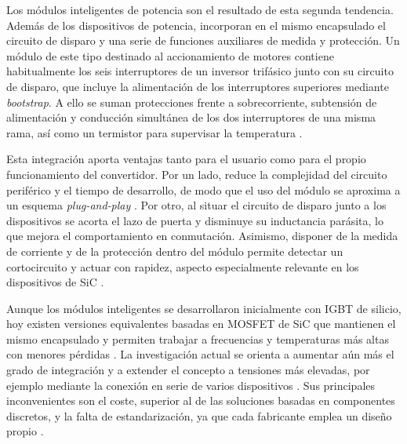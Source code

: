 Los módulos inteligentes de potencia son el resultado de esta segunda tendencia. Además de los dispositivos de potencia, incorporan en el mismo encapsulado el circuito de disparo y una serie de funciones auxiliares de medida y protección. Un módulo de este tipo destinado al accionamiento de motores contiene habitualmente los seis interruptores de un inversor trifásico junto con su circuito de disparo, que incluye la alimentación de los interruptores superiores mediante \textit{bootstrap}. A ello se suman protecciones frente a sobrecorriente, subtensión de alimentación y conducción simultánea de los dos interruptores de una misma rama, así como un termistor para supervisar la temperatura \cite{8507961}.

Esta integración aporta ventajas tanto para el usuario como para el propio funcionamiento del convertidor. Por un lado, reduce la complejidad del circuito periférico y el tiempo de desarrollo, de modo que el uso del módulo se aproxima a un esquema \textit{plug-and-play} \cite{10089509}. Por otro, al situar el circuito de disparo junto a los dispositivos se acorta el lazo de puerta y disminuye su inductancia parásita, lo que mejora el comportamiento en conmutación. Asimismo, disponer de la medida de corriente y de la protección dentro del módulo permite detectar un cortocircuito y actuar con rapidez, aspecto especialmente relevante en los dispositivos de SiC \cite{11630585}.

Aunque los módulos inteligentes se desarrollaron inicialmente con IGBT de silicio, hoy existen versiones equivalentes basadas en MOSFET de SiC que mantienen el mismo encapsulado y permiten trabajar a frecuencias y temperaturas más altas con menores pérdidas \cite{11269412}. La investigación actual se orienta a aumentar aún más el grado de integración y a extender el concepto a tensiones más elevadas, por ejemplo mediante la conexión en serie de varios dispositivos \cite{11630585, 10567643}. Sus principales inconvenientes son el coste, superior al de las soluciones basadas en componentes discretos, y la falta de estandarización, ya que cada fabricante emplea un diseño propio \cite{10089509}.
